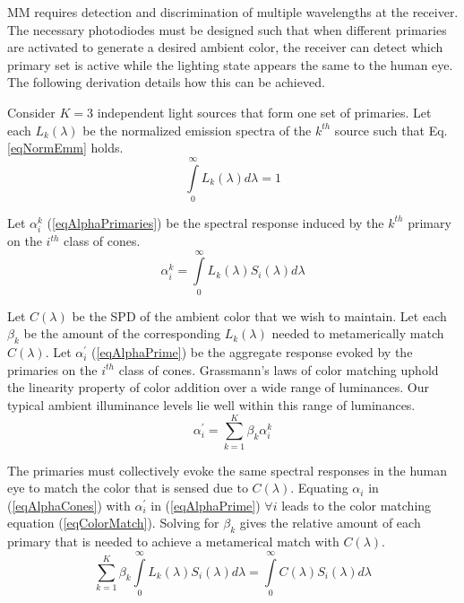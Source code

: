 
MM requires detection and discrimination of multiple wavelengths at the receiver. The necessary photodiodes must be designed such that when different primaries are activated to generate a desired ambient color, the receiver can detect which primary set is active while the lighting state appears the same to the human eye. The following derivation details how this can be achieved. 

Consider $K=3$ independent light sources that form one set of primaries. Let each $L_{k}(\lambda)$ be the normalized emission spectra of the $k^{th}$ source such that Eq. \eqref{eqNormEmm} holds.
\begin{equation}
	\label{eqNormEmm}
	\int\limits_{0}^{\infty} L_{k}(\lambda)d\lambda = 1
\end{equation}

Let $\alpha_{i}^{k}$ (\ref{eqAlphaPrimaries}) be the spectral response induced by the $k^{th}$ primary on the $i^{th}$ class of cones.
\begin{equation}
	\label{eqAlphaPrimaries}
	\alpha_{i}^{k} = \int\limits_{0}^{\infty} L_{k}(\lambda)S_{i}(\lambda)d\lambda
\end{equation}

Let $C(\lambda)$ be the SPD of the ambient color that we wish to maintain. Let each $\beta_{k}$ be the amount of the corresponding $L_{k}(\lambda)$ needed to metamerically match $C(\lambda)$. Let $\alpha_{i}^{'}$ (\ref{eqAlphaPrime}) be the aggregate response evoked by the primaries on the $i^{th}$ class of cones. Grassmann's laws of color matching uphold the linearity property of color addition over a wide range of luminances. Our typical ambient illuminance levels lie well within this range of luminances.
\begin{equation}
	\label{eqAlphaPrime}
	\alpha_{i}^{'} = \sum\limits_{k=1}^{K} \beta_{k}\alpha_{i}^{k}
\end{equation}

The primaries must collectively evoke the same spectral responses in the human eye to match the color that is sensed due to $C(\lambda)$. Equating $\alpha_{i}$ in (\ref{eqAlphaCones}) with $\alpha_{i}^{'}$ in (\ref{eqAlphaPrime}) $\forall i$ leads to the color matching equation (\ref{eqColorMatch}). Solving for $\beta_{k}$ gives the relative amount of each primary that is needed to achieve a metamerical match with $C(\lambda)$.
\begin{equation}
	\label{eqColorMatch}
	\sum\limits_{k=1}^{K} \beta_{k}\int\limits_{0}^{\infty} L_{k}(\lambda)S_{i}(\lambda)d\lambda = \int\limits_{0}^{\infty} C(\lambda)S_{i}(\lambda)d\lambda
\end{equation}

